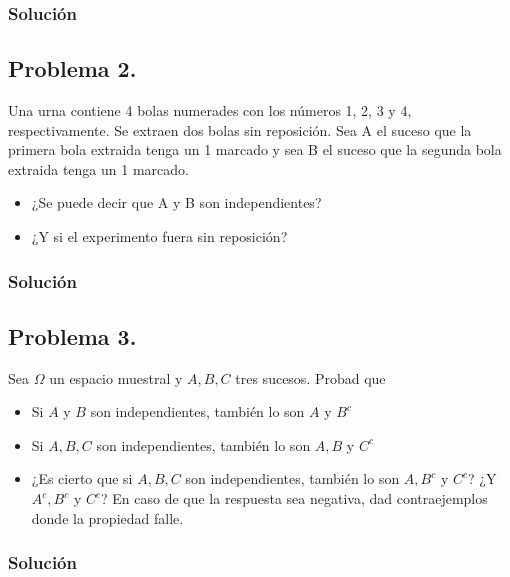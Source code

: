 \documentclass[
]{article}
\providecommand{\tightlist}{%
  \setlength{\itemsep}{0pt}\setlength{\parskip}{0pt}}
\begin{document}
\hypertarget{soluciuxf3n-17}{%
\subsubsection{Solución}\label{soluciuxf3n-17}}

\hypertarget{problema-2.}{%
\subsection{Problema 2.}\label{problema-2.}}

Una urna contiene 4 bolas numerades con los números 1, 2, 3 y 4,
respectivamente. Se extraen dos bolas sin reposición. Sea A el suceso
que la primera bola extraida tenga un 1 marcado y sea B el suceso que la
segunda bola extraida tenga un 1 marcado.

\begin{itemize}
\tightlist
\item
  ¿Se puede decir que A y B son independientes?
\item
  ¿Y si el experimento fuera sin reposición?
\end{itemize}

\hypertarget{soluciuxf3n-18}{%
\subsubsection{Solución}\label{soluciuxf3n-18}}

\hypertarget{problema-3.}{%
\subsection{Problema 3.}\label{problema-3.}}

Sea \(\Omega\) un espacio muestral y \(A,B,C\) tres sucesos. Probad que

\begin{itemize}
\tightlist
\item
  Si \(A\) y \(B\) son independientes, también lo son \(A\) y \(B^c\)
\item
  Si \(A,B,C\) son independientes, también lo son \(A,B\) y \(C^c\)
\item
  ¿Es cierto que si \(A,B,C\) son independientes, también lo son
  \(A,B^c\) y \(C^c\)? ¿Y \(A^c, B^c\) y \(C^c\)? En caso de que la
  respuesta sea negativa, dad contraejemplos donde la propiedad falle.
\end{itemize}

\hypertarget{soluciuxf3n-19}{%
\subsubsection{Solución}\label{soluciuxf3n-19}}
\end{document}
